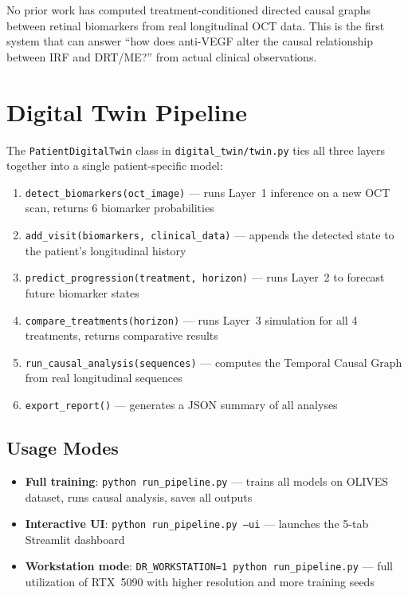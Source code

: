 \documentclass[12pt,a4paper]{article}
\begin{document}
No prior work has computed treatment-conditioned directed causal graphs between retinal biomarkers from real longitudinal OCT data. This is the first system that can answer ``how does anti-VEGF alter the causal relationship between IRF and DRT/ME?'' from actual clinical observations.

\section{Digital Twin Pipeline}

The \texttt{PatientDigitalTwin} class in \texttt{digital\_twin/twin.py} ties all three layers together into a single patient-specific model:

\begin{enumerate}[nosep]
  \item \texttt{detect\_biomarkers(oct\_image)} --- runs Layer~1 inference on a new OCT scan, returns 6 biomarker probabilities
  \item \texttt{add\_visit(biomarkers, clinical\_data)} --- appends the detected state to the patient's longitudinal history
  \item \texttt{predict\_progression(treatment, horizon)} --- runs Layer~2 to forecast future biomarker states
  \item \texttt{compare\_treatments(horizon)} --- runs Layer~3 simulation for all 4 treatments, returns comparative results
  \item \texttt{run\_causal\_analysis(sequences)} --- computes the Temporal Causal Graph from real longitudinal sequences
  \item \texttt{export\_report()} --- generates a JSON summary of all analyses
\end{enumerate}

\subsection{Usage Modes}

\begin{itemize}[nosep]
  \item \textbf{Full training}: \texttt{python run\_pipeline.py} --- trains all models on OLIVES dataset, runs causal analysis, saves all outputs
  \item \textbf{Interactive UI}: \texttt{python run\_pipeline.py --ui} --- launches the 5-tab Streamlit dashboard
  \item \textbf{Workstation mode}: \texttt{DR\_WORKSTATION=1 python run\_pipeline.py} --- full utilization of RTX~5090 with higher resolution and more training seeds
\end{itemize}
\end{document}
